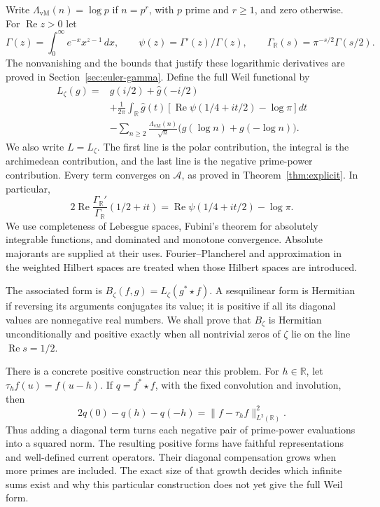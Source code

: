 \documentclass[11pt]{article}
\theoremstyle{definition}
\theoremstyle{remark}
\numberwithin{equation}{section}
\newcommand{\R}{\mathbb R}
\newcommand{\A}{\mathcal A}
\begin{document}
Write \(\Lambda_{\mathrm{vM}}(n)=\log p\) if \(n=p^r\), with \(p\)
prime and \(r\geq1\), and zero otherwise.  For \(\operatorname{Re}z>0\)
let
\[
 \Gamma(z)=\int_0^\infty e^{-x}x^{z-1}\,dx,
 \qquad \psi(z)=\Gamma'(z)/\Gamma(z),
 \qquad \Gamma_\R(s)=\pi^{-s/2}\Gamma(s/2).
\]
The nonvanishing and the bounds that justify these logarithmic
derivatives are proved in Section~\ref{sec:euler-gamma}.
Define the full Weil functional by
\begin{equation}
\begin{split}
 L_\zeta(g)={}&\widehat g(i/2)+\widehat g(-i/2)\\
 &+\frac1{2\pi}\int_\R\widehat g(t)
   \left[\operatorname{Re}\psi(1/4+it/2)-\log\pi\right]dt\\
 &-\sum_{n\geq2}\frac{\Lambda_{\mathrm{vM}}(n)}{\sqrt n}
                \bigl(g(\log n)+g(-\log n)\bigr).
\end{split}
\label{eq:weil-functional}
\end{equation}
We also write \(L=L_\zeta\).  The first line is the polar contribution,
the integral is the archimedean contribution, and the last line is the
negative prime-power contribution.  Every term converges on \(\A\), as
proved in Theorem~\ref{thm:explicit}.  In particular,
\begin{equation}
 2\operatorname{Re}\frac{\Gamma_\R'}{\Gamma_\R}(1/2+it)
   =\operatorname{Re}\psi(1/4+it/2)-\log\pi.
 \label{eq:gamma-normalization}
\end{equation}
We use completeness of Lebesgue spaces,
Fubini's theorem for absolutely integrable functions, and dominated and
monotone convergence.  Absolute majorants are supplied at their uses.
Fourier--Plancherel and approximation in the weighted Hilbert spaces
are treated when those Hilbert spaces are introduced.

The associated form is
\(B_\zeta(f,g)=L_\zeta(g^*\star f)\).  A sesquilinear form is Hermitian
if reversing its arguments conjugates its value; it is positive if all
its diagonal values are nonnegative real numbers.  We shall prove that
\(B_\zeta\) is Hermitian unconditionally and positive exactly when all
nontrivial zeros of \(\zeta\) lie on the line \(\operatorname{Re}s=1/2\).

There is a concrete positive construction near this problem.  For
\(h\in\R\), let \(\tau_h f(u)=f(u-h)\).  If
\(q=f^*\star f\), with the fixed convolution and involution,
then
\[
 2q(0)-q(h)-q(-h)=\|f-\tau_h f\|_{L^2(\R)}^2.
\]
Thus adding a diagonal term turns each negative pair of prime-power
evaluations into a squared norm.  The resulting positive forms have
faithful representations and well-defined current operators.  Their
diagonal compensation grows when more primes are included.  The exact
size of that growth decides which infinite sums exist and why this
particular construction does not yet give the full Weil form.
\end{document}
